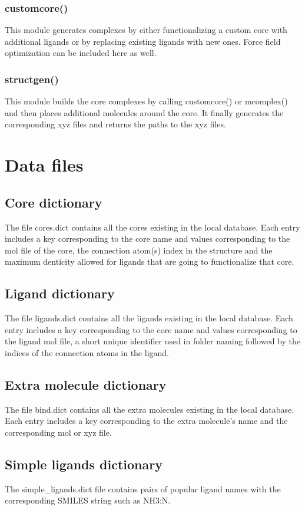 \documentclass[a4paper,12pt]{assignment}
\begin{document}
\subsubsection{customcore()}
This module generates complexes by either functionalizing a custom core with additional ligands or by replacing existing ligands with new ones.  Force field optimization can be included here as well.
\subsubsection{structgen()}
This module builds the core complexes by calling customcore() or mcomplex() and then places additional molecules around the core. It finally generates the corresponding xyz files and returns the paths to the xyz files.
\section{Data files}
\subsection{Core dictionary}
The file cores.dict contains all the cores existing in the local database. Each entry includes a key corresponding to the core name and values corresponding to the mol file of the core, the connection atom(s) index in the structure and the maximum denticity allowed for ligands that are going to functionalize that core.
\subsection{Ligand dictionary}
The file ligands.dict contains all the ligands  existing in the local database. Each entry includes a key corresponding to the core name and values corresponding to the ligand mol file, a short unique identifier used in folder naming followed by the indices of the connection atoms in the ligand.

\subsection{Extra molecule dictionary}
The file bind.dict contains all the extra molecules existing in the local database. Each entry includes a key corresponding to the extra molecule's name and the corresponding mol or xyz file.
\subsection{Simple ligands dictionary}
The simple\_ligands.dict file contains pairs of popular ligand names with the corresponding SMILES string such as NH3:N. 
\end{document}
